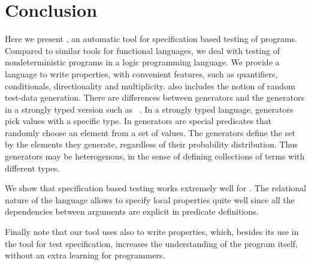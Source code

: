 \pagebreak

\section{Conclusion}
\label{sec:conclusion}



Here we present \plqc{}, an automatic tool for specification based
testing of \Prolog{} programs.
%
Compared to similar tools for functional languages, we deal with testing
of nondeterministic programs in a logic programming language.
%
We provide a language to write properties, with convenient features,
such as quantifiers, conditionals, directionality and multiplicity.
%
\plqc{} also includes the notion of random test-data generation.
%
There are differences between \plqc{} generators and the generators
in a strongly typed version such as \Haskell\ \QuickCheck.
%
In a strongly typed language, generators pick values with a specific
type.
%
In \plqc{} generators are special predicates that randomly choose an
element from a set of values.
%
The generators define the set by the elements they
generate, regardless of their probability distribution.
%
Thus \plqc{} generators may be heterogenous, in the sense of
defining collections of terms with different types.


We show that specification based testing works extremely well for
\Prolog.
%
The relational nature of the language allows to specify local properties
quite well since all the dependencies between arguments are explicit in
predicate definitions.


Finally note that our tool uses \Prolog{} also to write properties, which,
besides its use in the tool for test specification, increases the
understanding of the program itself, without an extra learning for
\Prolog{} programmers.

